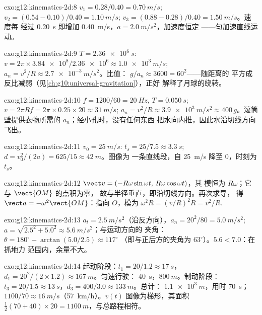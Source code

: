 \begin{solution}{exo:g12:kinematics-2d:8}
$v_1 = 0.28/0.40 = \qty{0.70}{m/s}$;
$v_2 = (0.54 - 0.10)/0.40 = \qty{1.10}{m/s}$;
$v_3 = (0.88 - 0.28)/0.40 = \qty{1.50}{m/s}$。速度每
经过 \qty{0.20}{s} 即增加 \qty{0.40}{m/s}，$a = \qty{2.0}{m/s^2}$，加速度恒定
——匀加速直线运动。
\end{solution}

\begin{solution}{exo:g12:kinematics-2d:9}
$T = \qty{2.36e6}{s}$: $v = 2\pi \times \num{3.84e8}/\num{2.36e6}
\approx \qty{1.0e3}{m/s}$;
$a_n = v^2/R \approx \qty{2.7e-3}{m/s^2}$。比值：
$g/a_n \approx 3600 = 60^2$——随距离的
平方成反比减弱（见\cref{ch:g10:universal-gravitation}），正好
解释了月球的绕转。
\end{solution}

\begin{solution}{exo:g12:kinematics-2d:10}
$f = 1200/60 = \qty{20}{Hz}$, $T = \qty{0.050}{s}$;
$v = 2\pi R f = 2\pi \times 0.25 \times 20 \approx \qty{31}{m/s}$;
$a_n = v^2/R \approx \qty{3.9e3}{m/s^2} \approx 400\,g$。滚筒
壁提供衣物所需的 $a_n$；经小孔时，没有任何东西
把水向内推，因此水沿切线方向飞出。
\end{solution}

\begin{solution}{exo:g12:kinematics-2d:11}
$v_0 = \qty{25}{m/s}$: $t_s = 25/7.5 \approx \qty{3.3}{s}$;
$d = v_0^2/(2a) = 625/15 \approx \qty{42}{m}$。图像为
一条直线段，自 \qty{25}{m/s} 降至 $0$，时刻为 $t_s$。
\end{solution}

\begin{solution}{exo:g12:kinematics-2d:12}
$\vect v = (-R\omega\sin\omega t,\, R\omega\cos\omega t)$，其
模恒为 $R\omega$；它与 $\vect{OM}$ 的点积为零，
故与半径垂直，即沿切线方向。再次求导，
得 $\vect a = -\omega^2\vect{OM}$：指向 $O$，模为
$\omega^2 R = (v/R)^2 R = v^2/R$.
\end{solution}

\begin{solution}{exo:g12:kinematics-2d:13}
$a_t = \qty{2.5}{m/s^2}$（沿反方向），$a_n = 20^2/80 =
\qty{5.0}{m/s^2}$;
$a = \sqrt{2.5^2 + 5.0^2} \approx \qty{5.6}{m/s^2}$；与运动方向的
夹角：$\theta = 180^\circ - \arctan(5.0/2.5) \approx 117^\circ$
（即与正后方的夹角为 $63^\circ$）。$5.6 < 7.0$：在抓地力
范围内，余量不大。
\end{solution}

\begin{solution}{exo:g12:kinematics-2d:14}
起动阶段：$t_1 = 20/1.2 \approx \qty{17}{s}$，
$d_1 = 20^2/(2 \times 1.2) \approx \qty{167}{m}$。匀速行驶：
\qty{40}{s}，$\qty{800}{m}$。制动阶段：$t_3 = 20/1.5 \approx
\qty{13}{s}$，$d_3 = 400/3.0 \approx \qty{133}{m}$。总计：
$\qty{1.1e3}{m}$，用时 \qty{70}{s}； $1100/70 \approx
\qty{16}{m/s}$（\qty{57}{km/h}）。$v(t)$ 图像为梯形，其面积
$\tfrac12(70 + 40) \times 20 = \qty{1100}{m}$，与总路程相符。
\end{solution}

